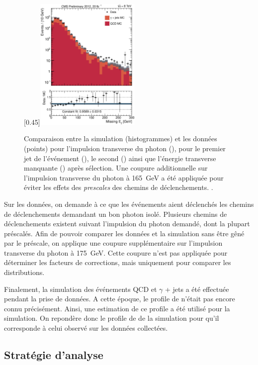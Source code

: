 \begin{figure}[p]
    \subcaptionbox{\label{met}}[0.45\textwidth]{\includegraphics[width=0.45\textwidth]{chapitre4/figs/MET_passedID_log.eps}}
    \caption{Comparaison entre la simulation (histogrammes) et les données (points) pour l'impulsion transverse du photon (), pour le premier jet de l'événement (), le second () ainsi que l'énergie transverse manquante () après sélection. Une coupure additionnelle sur l'impulsion transverse du photon à \SI{165}{\GeV} a été appliquée pour éviter les effets des \emph{prescales} des chemins de déclenchements. .}
    \label{fig:pt_photon_jet}
\end{figure}

\bigskip

Sur les données, on demande à ce que les événements aient déclenchés les chemins de déclenchements demandant un bon photon isolé. Plusieurs chemins de déclenchements existent suivant l'impulsion du photon demandé, dont la plupart préscalés. Afin de pouvoir comparer les données et la simulation sans être gêné par le préscale, on applique une coupure supplémentaire sur l'impulsion transverse du photon à \SI{175}{\GeV}. Cette coupure n'est pas appliquée pour déterminer les facteurs de corrections, mais uniquement pour comparer les distributions.

\smallskip

Finalement, la simulation des événements QCD et $\gamma$ + jets a été effectuée pendant la prise de données. A cette époque, le profile de \pu n'était pas encore connu précisément. Ainsi, une estimation de ce profile a été utilisé pour la simulation. On repondère donc le profile de \pu de la simulation pour qu'il corresponde à celui observé sur les données collectées.

\subsection{Stratégie d'analyse}

